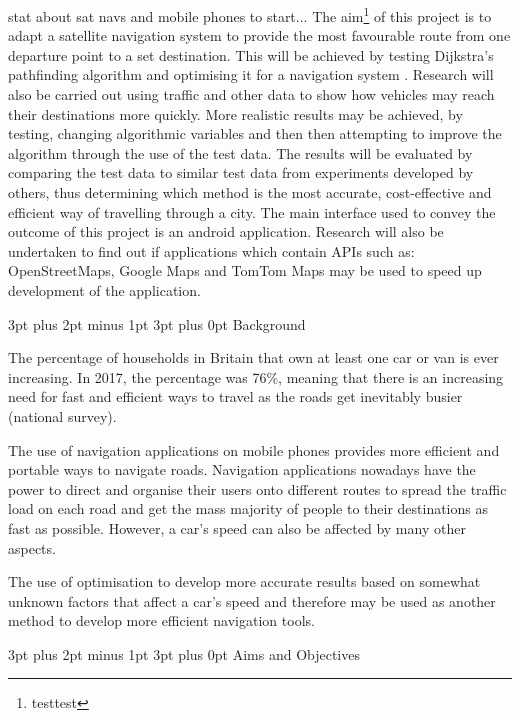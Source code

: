 \documentclass[12pt,a4paper]{article}
\makeatletter
\renewcommand\subsection{\@startsection {subsection}{1}{0mm} %
                               {3pt plus 2pt minus 1pt} %
                               {3pt plus 0pt} %
                               {\normalfont\bfseries}}
\makeatother
\begin{document}
stat about sat navs and mobile phones to start...
The aim\footnote{testtest} of this project is to adapt a satellite navigation system to provide the most favourable route from one departure point to a set destination. This will be achieved by testing Dijkstra's pathfinding algorithm and optimising it for a navigation system \cite{Dijkstra1959}. Research will also be carried out using traffic and other data to show how vehicles may reach their destinations more quickly. More realistic results may be achieved, by testing, changing algorithmic variables and then then attempting to improve the algorithm through the use of the test data. The results will be evaluated by comparing the test data to similar test data from experiments developed by others, thus determining which method is the most accurate, cost-effective and efficient way of travelling through a city. The main interface used to convey the outcome of this project is an android application. Research will also be undertaken to find out if applications which contain APIs such as: OpenStreetMaps, Google Maps and TomTom Maps may be used to speed up development of the application.

\subsection{Background}

The percentage of households in Britain that own at least one car or van is ever increasing. In 2017, the percentage was 76\%, meaning that there is an increasing need for fast and efficient ways to travel as the roads get inevitably busier (national survey).

The use of navigation applications on mobile phones provides more efficient and portable ways to navigate roads. Navigation applications nowadays have the power to direct and organise their users onto different routes to spread the traffic load on each road and get the mass majority of people to their destinations as fast as possible. However, a car’s speed can also be affected by many other aspects.

The use of optimisation to develop more accurate results based on somewhat unknown factors that affect a car’s speed and therefore may be used as another method to develop more efficient navigation tools.


\subsection{Aims and Objectives}
\end{document}
